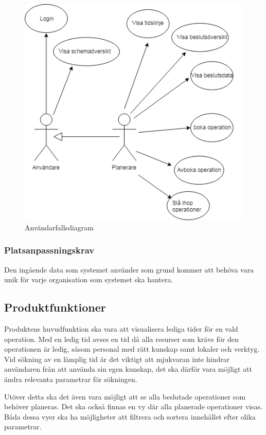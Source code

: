 \documentclass[twoside]{article}
\begin{document}
\begin{figure}
	\includegraphics[width=\textwidth,height=.7\textheight]{Usecasediagram.png}
	\caption{Användarfallsdiagram}
	\label{fig:Användarfallsdiagram}
\end{figure}


\subsubsection{Platsanpassningskrav}
\label{subsec:Platsanpassningskrav}
Den ingående data som systemet använder som grund kommer att behöva vara unik
för varje organisation som systemet ska hantera.
\subsection{Produktfunktioner}
\label{subsec:Produktfunktioner}
Produktens huvudfunktion ska vara att visualisera lediga tider för en vald
operation. Med en ledig tid avses en tid då alla resurser som krävs för den
operationen är ledig, såsom personal med rätt kunskap samt lokaler och verktyg.
Vid sökning av en lämplig tid är det viktigt att mjukvaran inte hindrar
användaren från att använda sin egen kunskap, det ska därför vara möjligt att
ändra relevanta parametrar för sökningen.

Utöver detta ska det även vara möjligt att se alla beslutade operationer som
behöver planeras. Det ska också finnas en vy där alla planerade operationer
visas. Båda dessa vyer ska ha möjligheter att filtrera och sortera innehållet
efter olika parametrar.
\end{document}
